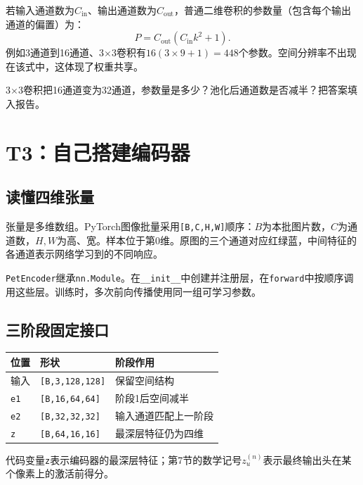 \documentclass[UTF8,a4paper,11pt,fontset=fandol]{ctexart}
\newcommand{\file}[1]{\nolinkurl{#1}}
\newcommand{\shape}[1]{\texttt{#1}}
\begin{document}
若输入通道数为$C_{\mathrm{in}}$、输出通道数为$C_{\mathrm{out}}$，普通二维卷积的参数量（包含每个输出通道的偏置）为：
\begin{equation}
P=C_{\mathrm{out}}(C_{\mathrm{in}}k^2+1).
\end{equation}
例如3通道到16通道、3$\times$3卷积有$16(3\times9+1)=448$个参数。空间分辨率不出现在该式中，这体现了权重共享。
\begin{questionbox}[检查点]
3$\times$3卷积把16通道变为32通道，参数量是多少？池化后通道数是否减半？把答案填入报告。
\end{questionbox}
\clearpage

\section{T3：自己搭建编码器}
\subsection{读懂四维张量}
张量是多维数组。PyTorch图像批量采用\shape{[B,C,H,W]}顺序：$B$为本批图片数，$C$为通道数，$H,W$为高、宽。样本位于第0维。原图的三个通道对应红绿蓝，中间特征的各通道表示网络学习到的不同响应。

\file{PetEncoder}继承\file{nn.Module}。在\file{__init__}中创建并注册层，在\file{forward}中按顺序调用这些层。训练时，多次前向传播使用同一组可学习参数。
\subsection{三阶段固定接口}
\par\noindent\begin{tabularx}{\linewidth}{L{2.1cm}L{4.2cm}Y}\toprule
位置 & 形状 & 阶段作用\\\midrule
输入 & \shape{[B,3,128,128]} & 保留空间结构\\
\file{e1} & \shape{[B,16,64,64]} & 阶段1后空间减半\\
\file{e2} & \shape{[B,32,32,32]} & 输入通道匹配上一阶段\\
\file{z} & \shape{[B,64,16,16]} & 最深层特征仍为四维\\\bottomrule
\end{tabularx}\par
代码变量\file{z}表示编码器的最深层特征；第7节的数学记号$z_u^{(n)}$表示最终输出头在某个像素上的激活前得分。
\end{document}
